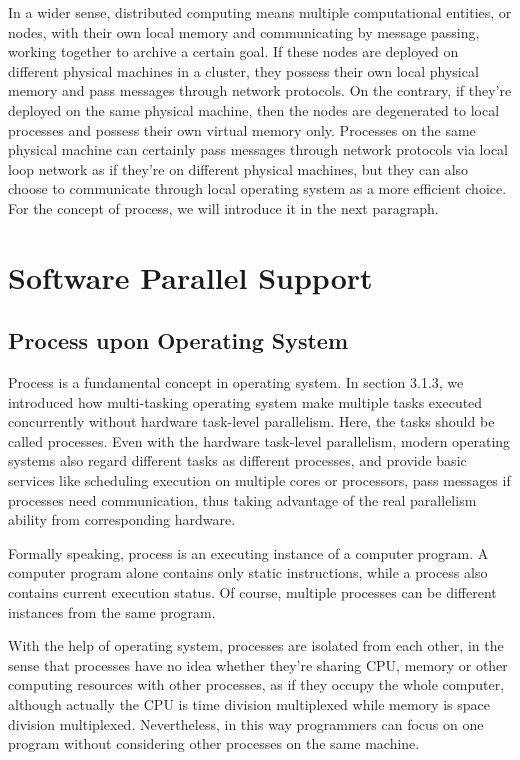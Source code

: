 \documentclass[12pt,a4paper]{report}
\begin{document}
In a wider sense, distributed computing means multiple computational entities, or nodes, with their own local memory and communicating by message passing, working together to archive a certain goal. If these nodes are deployed on different physical machines in a cluster, they possess their own local physical memory and pass messages through network protocols. On the contrary, if they're deployed on the same physical machine, then the nodes are degenerated to local processes and possess their own virtual memory only. Processes on the same physical machine can certainly pass messages through network protocols via local loop network as if they're on different physical machines, but they can also choose to communicate through local operating system as a more efficient choice. For the concept of process, we will introduce it in the next paragraph.

\section{Software Parallel Support}

\subsection{Process upon Operating System}

Process is a fundamental concept in operating system. In section 3.1.3, we introduced how multi-tasking operating system make multiple tasks executed concurrently without hardware task-level parallelism. Here, the tasks should be called processes. Even with the hardware task-level parallelism, modern operating systems also regard different tasks as different processes, and provide basic services like scheduling execution on multiple cores or processors, pass messages if processes need communication, thus taking advantage of the real parallelism ability from corresponding hardware.

Formally speaking, process is an executing instance of a computer program. A computer program alone contains only static instructions, while a process also contains current execution status. Of course, multiple processes can be different instances from the same program.

With the help of operating system, processes are isolated from each other, in the sense that processes have no idea whether they're sharing CPU, memory or other computing resources with other processes, as if they occupy the whole computer, although actually the CPU is time division multiplexed while memory is space division multiplexed. Nevertheless, in this way programmers can focus on one program without considering other processes on the same machine.
\end{document}
